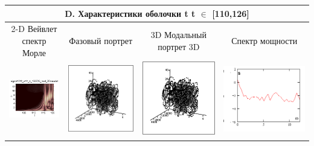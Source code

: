 \documentclass[12pt,letterpaper]{extreport}
\begin{document}
\begin{table}[H]
{\begin{tabular}{|c|c|c|c|}
\multicolumn{4}{|c|}{D. Характеристики оболочки t  
t $\in$ [110,126]}\\

\hline
\footnotesize 2-D Вейвлет спектр Морле&
\footnotesize Фазовый 
портрет&\footnotesize 3D Модальный портрет 3D&
\footnotesize Спектр мощности\\
\hline
	\includegraphics[scale=1]{d1} 	
	&	
	\includegraphics[scale=0.9]{d2} 	
	&	
	\includegraphics[scale=0.9]{d3} 
	&
	\includegraphics[scale=0.9]{d4} 
\\
\hline


\end{tabular}}
\end{table}
\end{document}
